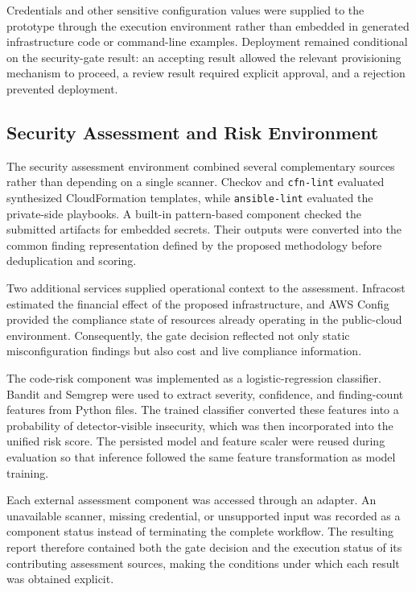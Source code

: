 Credentials and other sensitive configuration values were supplied to the prototype
through the execution environment rather than embedded in generated infrastructure code
or command-line examples. Deployment remained conditional on the security-gate result:
an accepting result allowed the relevant provisioning mechanism to proceed, a review
result required explicit approval, and a rejection prevented deployment.

\subsection{Security Assessment and Risk Environment}
\label{subsec:security-risk-environment}

The security assessment environment combined several complementary sources rather than
depending on a single scanner. Checkov and \texttt{cfn-lint} evaluated synthesized
CloudFormation templates, while \texttt{ansible-lint} evaluated the private-side
playbooks. A built-in pattern-based component checked the submitted artifacts for
embedded secrets. Their outputs were converted into the common finding representation
defined by the proposed methodology before deduplication and scoring.

Two additional services supplied operational context to the assessment. Infracost
estimated the financial effect of the proposed infrastructure, and AWS Config provided
the compliance state of resources already operating in the public-cloud environment.
Consequently, the gate decision reflected not only static misconfiguration findings but
also cost and live compliance information.

The code-risk component was implemented as a logistic-regression classifier. Bandit and
Semgrep were used to extract severity, confidence, and finding-count features from
Python files. The trained classifier converted these features into a probability of
detector-visible insecurity, which was then incorporated into the unified risk score.
The persisted model and feature scaler were reused during evaluation so that inference
followed the same feature transformation as model training.

Each external assessment component was accessed through an adapter. An unavailable
scanner, missing credential, or unsupported input was recorded as a component status
instead of terminating the complete workflow. The resulting report therefore contained
both the gate decision and the execution status of its contributing assessment sources,
making the conditions under which each result was obtained explicit.

